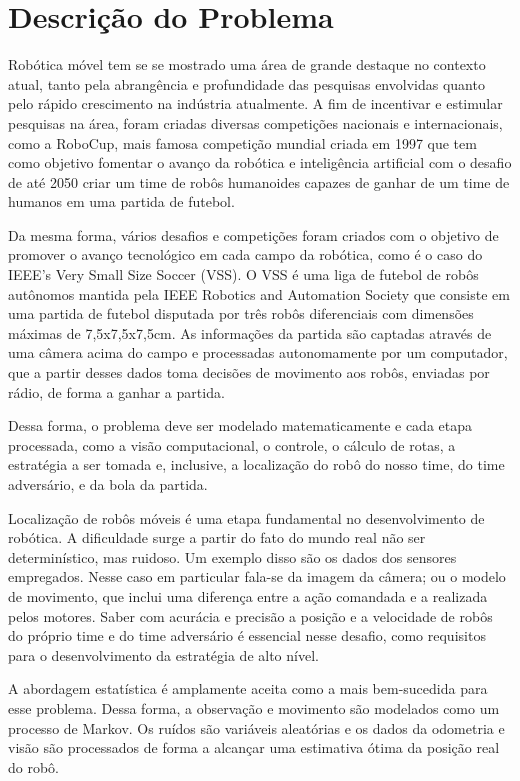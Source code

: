 \documentclass[a4paper,11pt]{article}
\begin{document}
\section{Descrição do Problema}

Robótica móvel tem se se mostrado uma área de grande destaque no contexto atual, tanto pela abrangência e profundidade das pesquisas envolvidas quanto pelo rápido crescimento na indústria atualmente. A fim de incentivar e estimular pesquisas na área, foram criadas diversas competições nacionais e internacionais, como a RoboCup, mais famosa competição mundial criada em 1997 que tem como objetivo fomentar o avanço da robótica e inteligência artificial com o desafio de até 2050 criar um time de robôs humanoides capazes de ganhar de um time de humanos em uma partida de futebol.

Da mesma forma, vários desafios e competições foram criados com o objetivo de promover o avanço tecnológico em cada campo da robótica, como é o caso do IEEE’s Very Small Size Soccer (VSS). O VSS é uma liga de futebol de robôs autônomos mantida pela IEEE Robotics and Automation Society que consiste em uma partida de futebol disputada por três robôs diferenciais com dimensões máximas de 7,5x7,5x7,5cm. As informações da partida são captadas através de uma câmera acima do campo e processadas autonomamente por um computador, que a partir desses dados toma decisões de movimento aos robôs, enviadas por rádio, de forma a ganhar a partida.

Dessa forma, o problema deve ser modelado matematicamente e cada etapa processada, como a visão computacional, o controle, o cálculo de rotas, a estratégia a ser tomada e, inclusive, a localização do robô do nosso time, do time adversário, e da bola da partida.

Localização de robôs móveis é uma etapa fundamental no desenvolvimento de robótica. A dificuldade surge a partir do fato do mundo real não ser determinístico, mas ruidoso. Um exemplo disso são os dados dos sensores empregados. Nesse caso em particular fala-se da imagem da câmera; ou o modelo de movimento, que inclui uma diferença entre a ação comandada e a realizada pelos motores. Saber com acurácia e precisão a posição e a velocidade de robôs do próprio time e do time adversário é essencial nesse desafio, como requisitos para o desenvolvimento da estratégia de alto nível.

A abordagem estatística é amplamente aceita como a mais bem-sucedida para esse problema. Dessa forma, a observação e movimento são modelados como um processo de Markov. Os ruídos são variáveis aleatórias e os dados da odometria e visão são processados de forma a alcançar uma estimativa ótima da posição real do robô.
\end{document}
